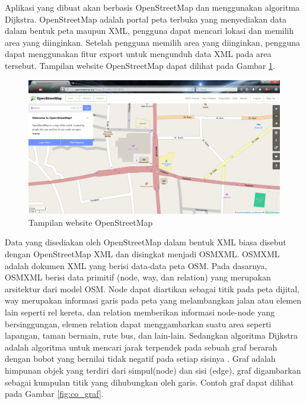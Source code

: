 Aplikasi yang dibuat akan berbasis OpenStreetMap dan menggunakan 
algoritma Dijkstra. OpenStreetMap adalah portal peta terbuka yang menyediakan data dalam bentuk 
peta maupun XML, pengguna dapat mencari lokasi dan memilih area yang
diinginkan. Setelah pengguna memilih area yang diinginkan, pengguna dapat menggunakan
fitur export untuk mengunduh data XML pada area tersebut. Tampilan website
OpenStreetMap dapat dilihat pada Gambar \ref{fig:web_osm}.
\begin{figure}[h]
\centering
\includegraphics[scale=0.3]{Gambar/web_osm}
\caption[Tampilan website OpenStreetMap]{Tampilan website OpenStreetMap
\footnotemark[1]}
\label{fig:web_osm}
\end{figure}
Data yang
disediakan oleh OpenStreetMap dalam bentuk XML biasa disebut
dengan OpenStreetMap XML dan disingkat menjadi OSMXML. OSMXML adalah dokumen XML
yang berisi data-data peta OSM. Pada dasarnya, OSMXML berisi data primitif
(node, way, dan relation) yang merupakan arsitektur dari model OSM. Node
dapat diartikan sebagai titik pada peta dijital, way merupakan informasi garis
pada peta yang melambangkan jalan atau elemen lain seperti rel kereta, dan
relation memberikan informasi node-node yang bersinggungan, elemen
relation dapat menggambarkan suatu area seperti lapangan, taman bermain, rute
bus, dan lain-lain. Sedangkan algoritma Dijkstra
adalah algoritma untuk mencari jarak terpendek pada sebuah graf berarah dengan bobot yang bernilai tidak negatif pada setiap sisinya
\cite{Cormen:2001}. Graf adalah himpunan objek yang terdiri dari simpul(node)
dan sisi (edge), graf digambarkan sebagai kumpulan titik yang dihubungkan oleh garis. 
Contoh graf dapat dilihat pada Gambar \ref{fig:co_graf}.
